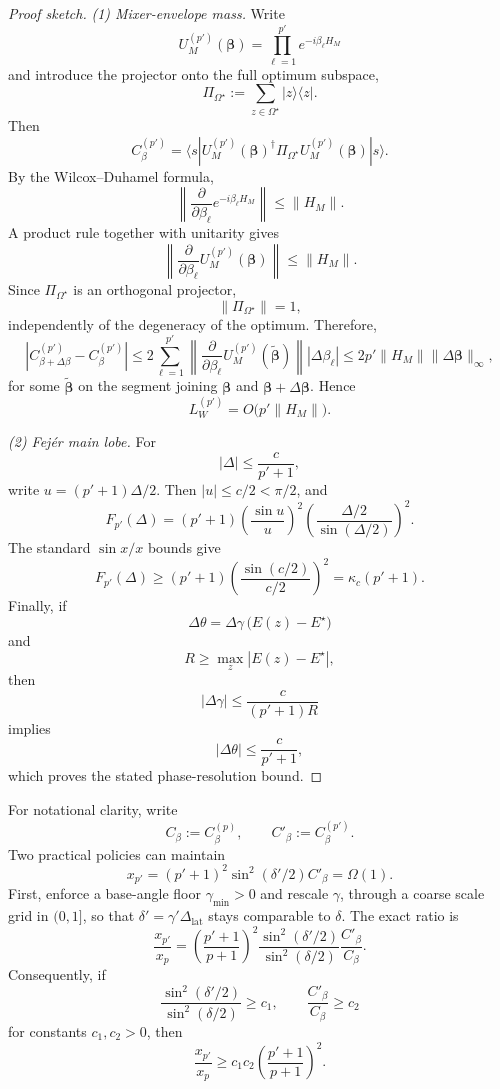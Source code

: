 \documentclass[a4paper,unpublished,onecolumn,11pt]{quantumarticle}
\theoremstyle{definition}
\theoremstyle{remark}
\begin{document}
\begin{proof}[Proof sketch]
\emph{(1) Mixer-envelope mass.}
Write
\[
U_M^{(p')}(\boldsymbol\beta)
=
\prod_{\ell=1}^{p'}
e^{-i\beta_\ell H_M}
\]
and introduce the projector onto the full optimum subspace,
\[
\Pi_{\Omega^\star}
:=
\sum_{z\in\Omega^\star}
|z\rangle\langle z|.
\]
Then
\[
C_{\beta}^{(p')}
=
\langle s|
U_M^{(p')}(\boldsymbol\beta)^\dagger
\Pi_{\Omega^\star}
U_M^{(p')}(\boldsymbol\beta)
|s\rangle.
\]
By the Wilcox--Duhamel formula,
\[
\left\|
\frac{\partial}{\partial\beta_\ell}
e^{-i\beta_\ell H_M}
\right\|
\le
\|H_M\|.
\]
A product rule together with unitarity gives
\[
\left\|
\frac{\partial}{\partial\beta_\ell}
U_M^{(p')}(\boldsymbol\beta)
\right\|
\le
\|H_M\|.
\]
Since \(\Pi_{\Omega^\star}\) is an orthogonal projector,
\[
\|\Pi_{\Omega^\star}\|=1,
\]
independently of the degeneracy of the optimum. Therefore,
\[
\left|
C_{\beta+\Delta\beta}^{(p')}
-
C_{\beta}^{(p')}
\right|
\le
2
\sum_{\ell=1}^{p'}
\left\|
\frac{\partial}{\partial\beta_\ell}
U_M^{(p')}(\widetilde{\boldsymbol\beta})
\right\|
|\Delta\beta_\ell|
\le
2p'\|H_M\|
\|\Delta\boldsymbol\beta\|_\infty,
\]
for some \(\widetilde{\boldsymbol\beta}\) on the segment joining
\(\boldsymbol\beta\) and
\(\boldsymbol\beta+\Delta\boldsymbol\beta\). Hence
\[
L_W^{(p')}
=
O\!\bigl(p'\|H_M\|\bigr).
\]

\smallskip
\emph{(2) Fej\'er main lobe.}
For
\[
|\Delta|
\le
\frac{c}{p'+1},
\]
write \(u=(p'+1)\Delta/2\). Then \(|u|\le c/2<\pi/2\), and
\[
F_{p'}(\Delta)
=
(p'+1)
\left(
\frac{\sin u}{u}
\right)^2
\left(
\frac{\Delta/2}{\sin(\Delta/2)}
\right)^2.
\]
The standard \(\sin x/x\) bounds give
\[
F_{p'}(\Delta)
\ge
(p'+1)
\left(
\frac{\sin(c/2)}{c/2}
\right)^2
=
\kappa_c(p'+1).
\]
Finally, if
\[
\Delta\theta
=
\Delta\gamma\,
\bigl(E(z)-E^\star\bigr)
\]
and
\[
R
\ge
\max_z|E(z)-E^\star|,
\]
then
\[
|\Delta\gamma|
\le
\frac{c}{(p'+1)R}
\]
implies
\[
|\Delta\theta|
\le
\frac{c}{p'+1},
\]
which proves the stated phase-resolution bound.
\end{proof}

For notational clarity, write
\[
C_\beta:=C_\beta^{(p)},
\qquad
C'_\beta:=C_\beta^{(p')}.
\]
Two practical policies can maintain
\[
x_{p'}
=
(p'+1)^2
\sin^2(\delta'/2)
C'_\beta
=
\Omega(1).
\]
First, enforce a base-angle floor \(\gamma_{\min}>0\) and rescale
\(\gamma\), through a coarse scale grid in \((0,1]\), so that
\(\delta'=\gamma'\Delta_{\mathrm{lat}}\) stays comparable to \(\delta\).
The exact ratio is
\[
\frac{x_{p'}}{x_p}
=
\left(
\frac{p'+1}{p+1}
\right)^2
\frac{\sin^2(\delta'/2)}{\sin^2(\delta/2)}
\frac{C'_\beta}{C_\beta}.
\]
Consequently, if
\[
\frac{\sin^2(\delta'/2)}{\sin^2(\delta/2)}
\ge c_1,
\qquad
\frac{C'_\beta}{C_\beta}
\ge c_2
\]
for constants \(c_1,c_2>0\), then
\[
\frac{x_{p'}}{x_p}
\ge
c_1c_2
\left(
\frac{p'+1}{p+1}
\right)^2.
\]
\end{document}
